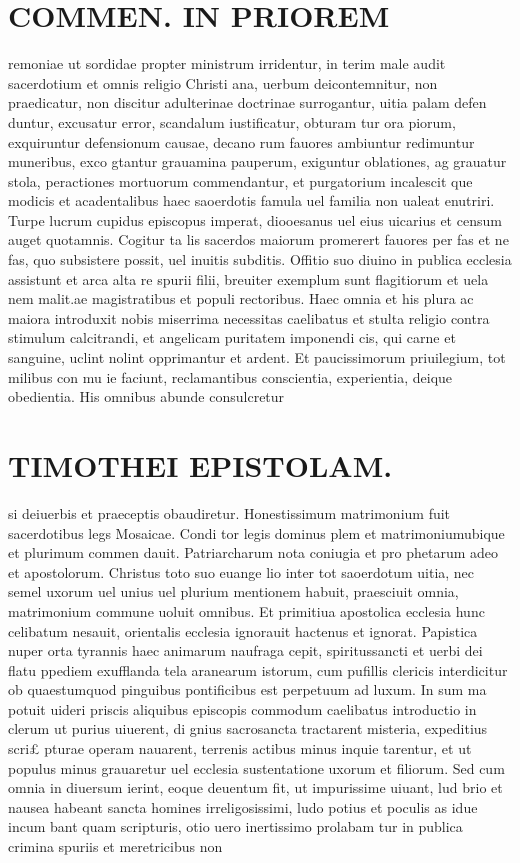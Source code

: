 \documentclass{article}
\begin{document}
\begin{pages}
\section*{COMMEN. IN PRIOREM }
\marginpar{[ p.70 ]}\pstart remoniae ut sordidae propter ministrum irridentur, in terim male audit sacerdotium et omnis religio Christi ana, uerbum deicontemnitur, non praedicatur, non discitur adulterinae doctrinae surrogantur, uitia palam defen duntur, excusatur error, scandalum iustificatur, obturam tur ora piorum, exquiruntur defensionum causae, decano rum fauores ambiuntur redimuntur muneribus, exco gtantur grauamina pauperum, exiguntur oblationes, ag grauatur stola, peractiones mortuorum commendantur, et purgatorium incalescit que modicis et acadentalibus haec saoerdotis famula uel familia non ualeat enutriri. Turpe lucrum cupidus episcopus imperat, diooesanus uel eius uicarius et censum auget quotamnis. Cogitur ta lis sacerdos maiorum promerert fauores per fas et ne fas, quo subsistere possit, uel inuitis subditis. Offitio suo diuino in publica ecclesia assistunt et arca alta re spurii filii, breuiter exemplum sunt flagitiorum et uela nem malit.ae magistratibus et populi rectoribus. Haec omnia et his plura ac maiora introduxit nobis miserrima necessitas caelibatus et stulta religio contra stimulum calcitrandi, et angelicam puritatem imponendi cis, qui carne et sanguine, uclint nolint opprimantur et ardent. Et paucissimorum priuilegium, tot milibus con mu ie faciunt, reclamantibus conscientia, experientia, deique obedientia. His omnibus abunde consulcretur  \pend
\section*{TIMOTHEI EPISTOLAM. }
\marginpar{[ p.71 ]}\pstart si deiuerbis et praeceptis obaudiretur. Honestissimum matrimonium fuit sacerdotibus legs Mosaicae. Condi tor legis dominus plem et matrimoniumubique et plurimum commen dauit. Patriarcharum nota coniugia et pro phetarum adeo et apostolorum. Christus toto suo euange lio inter tot saoerdotum uitia, nec semel uxorum uel unius uel plurium mentionem habuit, praesciuit omnia, matrimonium commune uoluit omnibus. Et primitiua apostolica ecclesia hunc celibatum nesauit, orientalis ecclesia ignorauit hactenus et ignorat. Papistica nuper orta tyrannis haec animarum naufraga cepit, spiritussancti et uerbi dei flatu ppediem exufflanda tela aranearum istorum, cum pufillis clericis interdicitur ob quaestumquod pinguibus pontificibus est perpetuum ad luxum. In sum ma potuit uideri priscis aliquibus episcopis commodum caelibatus introductio in clerum ut purius uiuerent, di gnius sacrosancta tractarent misteria, expeditius scri£ pturae operam nauarent, terrenis actibus minus inquie tarentur, et ut populus minus grauaretur uel ecclesia sustentatione uxorum et filiorum. Sed cum omnia in diuersum ierint, eoque deuentum fit, ut impurissime uiuant, lud brio et nausea habeant sancta homines irreligosissimi, ludo potius et poculis as idue incum bant quam scripturis, otio uero inertissimo prolabam tur in publica crimina spuriis et meretricibus non  \pend

\end{pages}
\end{document}
